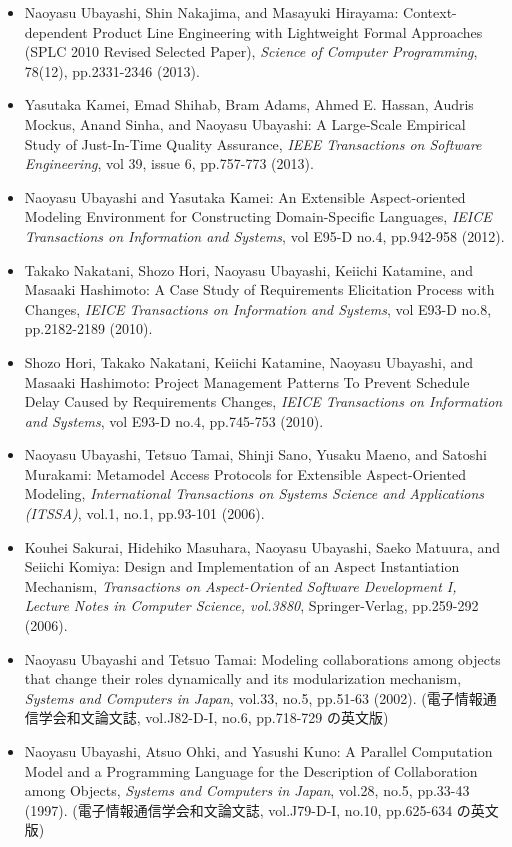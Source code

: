 \documentclass{jarticle}
\begin{document}
\begin{itemize}
\item Naoyasu Ubayashi, Shin Nakajima, and Masayuki Hirayama:
Context-dependent Product Line Engineering with Lightweight Formal Approaches (SPLC 2010 Revised Selected Paper),
{\em Science of Computer Programming}, 78(12), pp.2331-2346 (2013).

\item Yasutaka Kamei, Emad Shihab, Bram Adams, Ahmed E. Hassan, Audris Mockus, Anand Sinha, and Naoyasu Ubayashi:
A Large-Scale Empirical Study of Just-In-Time Quality Assurance,
{\em IEEE Transactions on Software Engineering}, vol 39, issue 6, pp.757-773 (2013).

\item Naoyasu Ubayashi and Yasutaka Kamei:
An Extensible Aspect-oriented Modeling Environment for Constructing Domain-Specific Languages,
{\em IEICE Transactions on Information and Systems}, vol E95-D no.4, pp.942-958 (2012).

\item Takako Nakatani, Shozo Hori, Naoyasu Ubayashi, Keiichi Katamine, and Masaaki Hashimoto:
A Case Study of Requirements Elicitation Process with Changes,
{\em IEICE Transactions on Information and Systems}, vol E93-D no.8, pp.2182-2189 (2010).

\item Shozo Hori, Takako Nakatani, Keiichi Katamine, Naoyasu Ubayashi, and Masaaki Hashimoto:
Project Management Patterns To Prevent Schedule Delay Caused by Requirements Changes,
{\em IEICE Transactions on Information and Systems}, vol E93-D no.4, pp.745-753 (2010).

\item Naoyasu Ubayashi, Tetsuo Tamai, Shinji Sano, Yusaku Maeno, and Satoshi Murakami:
Metamodel Access Protocols for Extensible Aspect-Oriented Modeling,
{\em International Transactions on Systems Science and Applications (ITSSA)},
vol.1, no.1, pp.93-101 (2006).

\item Kouhei Sakurai, Hidehiko Masuhara, Naoyasu Ubayashi, Saeko Matuura, and Seiichi Komiya: 
Design and Implementation of an Aspect Instantiation Mechanism,
{\em Transactions on Aspect-Oriented Software Development I,
Lecture Notes in Computer Science, vol.3880}, Springer-Verlag,
pp.259-292 (2006).

\item Naoyasu Ubayashi and Tetsuo Tamai:
Modeling collaborations among objects that change their roles dynamically and its modularization mechanism,
{\em Systems and Computers in Japan},
vol.33, no.5, pp.51-63 (2002).
(電子情報通信学会和文論文誌, vol.J82-D-I, no.6, pp.718-729 の英文版)

\item Naoyasu Ubayashi, Atsuo Ohki, and Yasushi Kuno: 
A Parallel Computation Model and a Programming Language 
for the Description of Collaboration among Objects,
{\em Systems and Computers in Japan},
vol.28, no.5, pp.33-43 (1997).
(電子情報通信学会和文論文誌, vol.J79-D-I, no.10, pp.625-634 の英文版)
\end{itemize}
\end{document}
